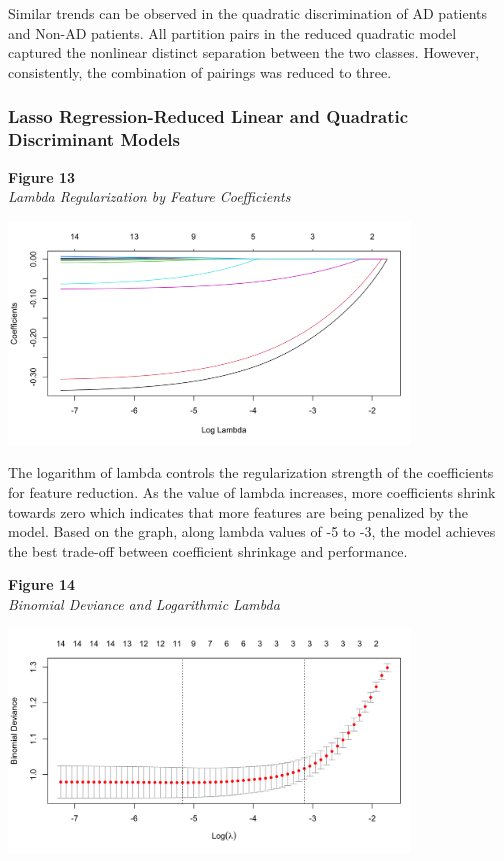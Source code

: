 \documentclass[12pt]{article}
\begin{document}
Similar trends can be observed in the quadratic discrimination of AD patients and Non-AD patients. All partition pairs in the reduced quadratic model captured the nonlinear distinct separation between the two classes. However, consistently, the combination of pairings was reduced to three. 

\subsubsection{Lasso Regression-Reduced Linear and Quadratic Discriminant Models}
\textbf{Figure 13} \\ 
\textit{Lambda Regularization by Feature Coefficients}
\begin{center}
    \includegraphics[width = 0.8\textwidth]{Coefficient vs Log Lambda.png}
\end{center}

The logarithm of lambda controls the regularization strength of the coefficients for feature reduction. As the value of lambda increases, more coefficients shrink towards zero which indicates that more features are being penalized by the model. Based on the graph, along lambda values of -5 to -3, the model 
achieves the best trade-off between coefficient shrinkage and performance. 

\noindent
\textbf{Figure 14}\\
\textit{Binomial Deviance and Logarithmic Lambda}
\begin{center}
    \includegraphics[width = 0.8\textwidth]{Binomial Deviance vs Log Lambda.png}
\end{center}
\end{document}
